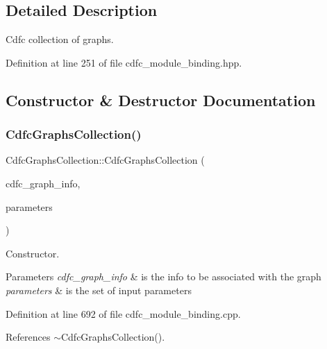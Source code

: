 \subsection{Detailed Description}
Cdfc collection of graphs. 

Definition at line 251 of file cdfc\+\_\+module\+\_\+binding.\+hpp.



\subsection{Constructor \& Destructor Documentation}
\mbox{\label{classCdfcGraphsCollection_a20aad56ae7626fed60060372f4164f72}} 
\subsubsection{\texorpdfstring{Cdfc\+Graphs\+Collection()}{CdfcGraphsCollection()}}
{\footnotesize\ttfamily Cdfc\+Graphs\+Collection\+::\+Cdfc\+Graphs\+Collection (\begin{DoxyParamCaption}\item[{const \hyperlink{cdfc__module__binding_8hpp_a3a026fb9b4dd23bdaed64df0cf832dd8}{Cdfc\+Graph\+Info\+Ref}}]{cdfc\+\_\+graph\+\_\+info,  }\item[{const \hyperlink{Parameter_8hpp_a37841774a6fcb479b597fdf8955eb4ea}{Parameter\+Const\+Ref}}]{parameters }\end{DoxyParamCaption})}



Constructor. 


\begin{DoxyParams}{Parameters}
{\em cdfc\+\_\+graph\+\_\+info} & is the info to be associated with the graph \\
\hline
{\em parameters} & is the set of input parameters \\
\hline
\end{DoxyParams}


Definition at line 692 of file cdfc\+\_\+module\+\_\+binding.\+cpp.



References $\sim$\+Cdfc\+Graphs\+Collection().

